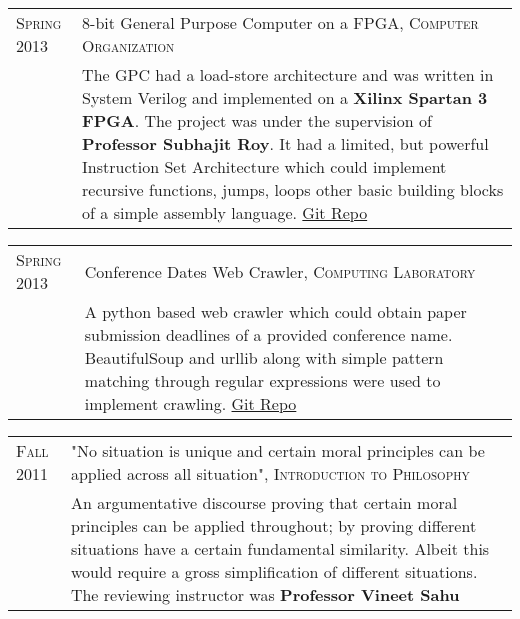 \documentclass[a4paper,10pt]{article} %
\begin{document}
\begin{tabular}{p{2.2cm}|p{11cm}}
    \textsc{Spring 2013} & 8-bit General Purpose Computer on a FPGA, \textsc{Computer Organization} \\
                         & \footnotesize{The GPC had a load-store architecture and was written in System Verilog and
                            implemented on a \textbf{Xilinx Spartan 3 FPGA}.  The project was under the
                            supervision of \textbf{Professor Subhajit Roy}.  It had a limited, but powerful
                            Instruction Set Architecture which could implement recursive functions, jumps,
                            loops  other basic building blocks of a simple assembly language.
                            \href{https://github.com/srijanshetty/220_y11} {Git Repo}} \\
\end{tabular}

\begin{tabular}{p{2.2cm}|p{11cm}}
    \textsc{Spring 2013} & Conference Dates Web Crawler, \textsc{Computing Laboratory} \\
                         & \footnotesize{A python based web crawler which could obtain paper submission
                            deadlines of a provided conference name.  BeautifulSoup and urllib along
                            with simple pattern matching through regular expressions were used to implement crawling.
                            \href{https://github.com/srijanshetty/crawler} {Git Repo} } \\
\end{tabular}

\begin{tabular}{p{2.2cm}|p{11cm}}
    \textsc{Fall 2011} & "No situation is unique and certain moral principles can be applied across all situation",
                         \textsc{Introduction to Philosophy} \\
                       & \footnotesize{ An argumentative discourse proving that certain moral principles
                         can be applied throughout; by proving different situations have a certain
                         fundamental similarity.  Albeit this would require a gross simplification of
                         different situations.  The reviewing instructor was \textbf{Professor Vineet Sahu}} \\
\end{tabular}

\end{document}

